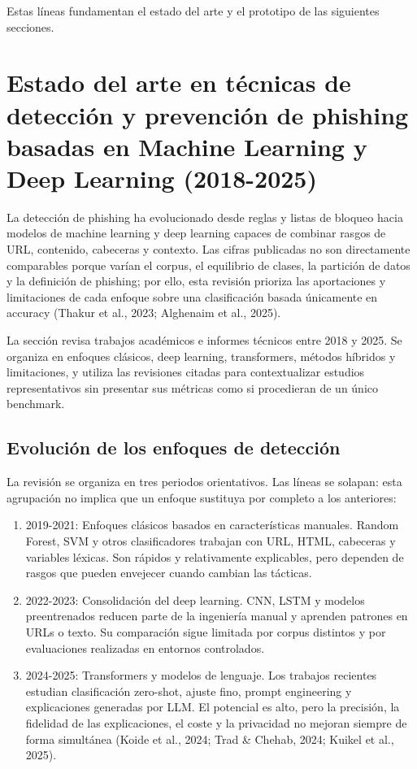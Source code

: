 \documentclass[11pt,a4paper,oneside]{report}
\begin{document}
Estas líneas fundamentan el estado del arte y el prototipo de las siguientes secciones.

\chapter{Estado del arte en técnicas de detección y prevención de phishing basadas en Machine Learning y Deep Learning (2018-2025)}

La detección de phishing ha evolucionado desde reglas y listas de bloqueo hacia modelos de machine learning y deep learning capaces de combinar rasgos de URL, contenido, cabeceras y contexto. Las cifras publicadas no son directamente comparables porque varían el corpus, el equilibrio de clases, la partición de datos y la definición de phishing; por ello, esta revisión prioriza las aportaciones y limitaciones de cada enfoque sobre una clasificación basada únicamente en accuracy (Thakur et al., 2023; Alghenaim et al., 2025).

La sección revisa trabajos académicos e informes técnicos entre 2018 y 2025. Se organiza en enfoques clásicos, deep learning, transformers, métodos híbridos y limitaciones, y utiliza las revisiones citadas para contextualizar estudios representativos sin presentar sus métricas como si procedieran de un único benchmark.

\section{Evolución de los enfoques de detección}

La revisión se organiza en tres periodos orientativos. Las líneas se solapan: esta agrupación no implica que un enfoque sustituya por completo a los anteriores:

\begin{enumerate}
  \item 2019-2021: Enfoques clásicos basados en características manuales. Random Forest, SVM y otros clasificadores trabajan con URL, HTML, cabeceras y variables léxicas. Son rápidos y relativamente explicables, pero dependen de rasgos que pueden envejecer cuando cambian las tácticas.
  \item 2022-2023: Consolidación del deep learning. CNN, LSTM y modelos preentrenados reducen parte de la ingeniería manual y aprenden patrones en URLs o texto. Su comparación sigue limitada por corpus distintos y por evaluaciones realizadas en entornos controlados.
  \item 2024-2025: Transformers y modelos de lenguaje. Los trabajos recientes estudian clasificación zero-shot, ajuste fino, prompt engineering y explicaciones generadas por LLM. El potencial es alto, pero la precisión, la fidelidad de las explicaciones, el coste y la privacidad no mejoran siempre de forma simultánea (Koide et al., 2024; Trad \& Chehab, 2024; Kuikel et al., 2025).
\end{enumerate}
\end{document}
